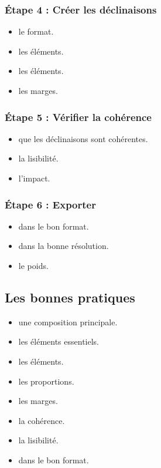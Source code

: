 \subsubsection{Étape 4 : Créer les déclinaisons}

\begin{itemize}
    \item {} le format.
    \item {} les éléments.
    \item {} les éléments.
    \item {} les marges.
\end{itemize}

\subsubsection{Étape 5 : Vérifier la cohérence}

\begin{itemize}
    \item {} que les déclinaisons sont cohérentes.
    \item {} la lisibilité.
    \item {} l'impact.
\end{itemize}

\subsubsection{Étape 6 : Exporter}

\begin{itemize}
    \item {} dans le bon format.
    \item {} dans la bonne résolution.
    \item {} le poids.
\end{itemize}

\subsection{Les bonnes pratiques}

\begin{itemize}
    \item {} une composition principale.
    \item {} les éléments essentiels.
    \item {} les éléments.
    \item {} les proportions.
    \item {} les marges.
    \item {} la cohérence.
    \item {} la lisibilité.
    \item {} dans le bon format.
\end{itemize}

